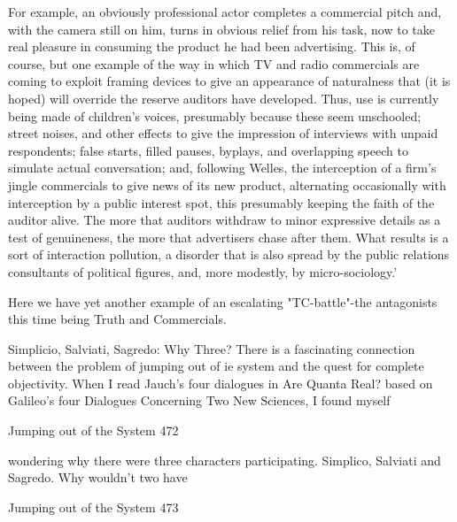 {   For example, an obviously professional actor completes a commercial pitch and,
   with the camera still on him, turns in obvious relief from his task, now to take real
   pleasure in consuming the product he had been advertising.
        This is, of course, but one example of the way in which TV and radio
   commercials are coming to exploit framing devices to give an appearance of
   naturalness that (it is hoped) will override the reserve auditors have developed.
   Thus, use is currently being made of children's voices, presumably because these
   seem unschooled; street noises, and other effects to give the impression of
   interviews with unpaid respondents; false starts, filled pauses, byplays, and
   overlapping speech to simulate actual conversation; and, following Welles, the
   interception of a firm's jingle commercials to give news of its new product,
   alternating occasionally with interception by a public interest spot, this presumably
   keeping the faith of the auditor alive.
        The more that auditors withdraw to minor expressive details as a test of
   genuineness, the more that advertisers chase after them. What results is a sort of
   interaction pollution, a disorder that is also spread by the public relations
   consultants of political figures, and, more modestly, by micro-sociology.'


Here we have yet another example of an escalating "TC-battle"-the antagonists this time
being Truth and Commercials.


                    Simplicio, Salviati, Sagredo: Why Three?
There is a fascinating connection between the problem of jumping out of ie system and
the quest for complete objectivity. When I read Jauch's four dialogues in Are Quanta
Real? based on Galileo's four Dialogues Concerning Two New Sciences, I found myself


Jumping out of the System                                                                  472

wondering why there were three characters participating. Simplico, Salviati and Sagredo.
Why wouldn’t two have




Jumping out of the System                                                           473

}
